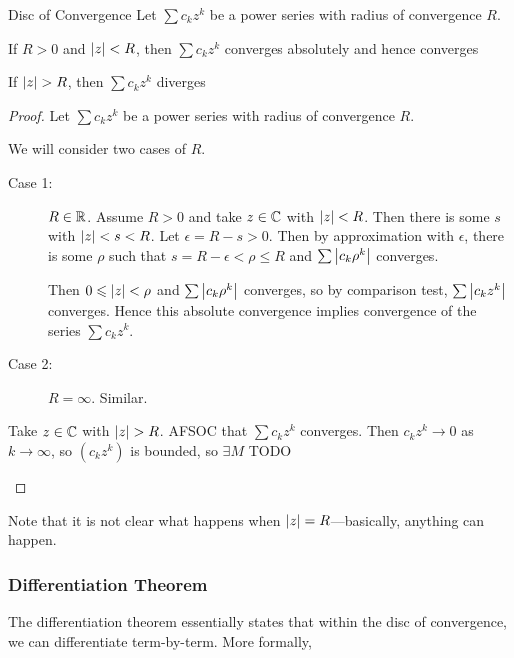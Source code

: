 \documentclass{styles/tufte}
\begin{document}
      \begin{proposition}{Disc of Convergence}{}
        Let $\sum c_k z^k$ be a power series with radius of convergence $R$.
        \begin{romanenum}
          \item If $R > 0$ and $\abs{z} < R$, then $\sum c_k z^k$ converges absolutely and hence converges
          \item If $\abs{z} > R$, then $\sum c_k z^k$ diverges
        \end{romanenum}
      \end{proposition}
      \begin{proof} Let $\sum c_k z^k$ be a power series with radius of convergence $R$.
        \begin{romanenum}
          \item We will consider two cases of $R$.
            \begin{description}
              \item[Case 1:] $R \in \mathbb{R}$. Assume $R > 0$ and take $z \in \mathbb{C}$ with $\abs{z} < R$. Then there is some $s$ with $\abs{z} < s < R$. Let $\epsilon = R - s > 0$. Then by approximation with $\epsilon$, there is some $\rho$ such that $s = R - \epsilon < \rho \leqslant R$ and $\sum \abs{c_k \rho^k}$ converges.
                
                Then $0 \leqslant \abs{z} < \rho$ and $\sum \abs{c_k \rho^k}$ converges, so by comparison test, $\sum \abs{c_k z^k}$ converges. Hence this absolute convergence implies convergence of the series $\sum c_k z^k$.
              \item[Case 2:] $R = \infty$. Similar.
            \end{description}
          \item Take $z \in \mathbb{C}$ with $\abs{z} > R$. AFSOC that $\sum c_k z^k$ converges. Then $c_k z^k \to 0$ as $k \to \infty$, so $(c_k z^k)$ is bounded, so $\exists M$ TODO
        \end{romanenum}
      \end{proof}
      
      Note that it is not clear what happens when $\abs{z} = R$---basically, anything can happen.
    
    \subsubsection{Differentiation Theorem}
      
      The differentiation theorem essentially states that within the disc of convergence, we can differentiate term-by-term. More formally,
      
\end{document}
